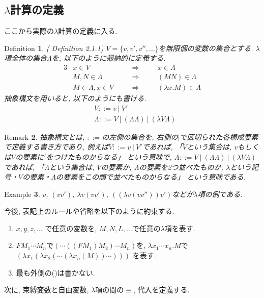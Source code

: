 \documentclass[11pt]{jsreport}
\theoremstyle{mystyle}
\newtheorem{df}{$\textrm{Definition}$}[section]
\newtheorem{ex}[df]{$\textrm{Example}$}
\newtheorem{rmk}[df]{$\textrm{Remark}$}
\newcommand{\brmk}{\begin{rmk}}
\newcommand{\ermk}{\end{rmk}}
\newcommand{\Lra}{\Longrightarrow}
\newcommand{\0}{\textbf{0}}
\begin{document}
\subsection*{$\lambda$計算の定義}
ここから実際の$\lambda$計算の定義に入る. 
\begin{shadebox}
  \begin{df}{(\cite{Bar} Definition 2.1.1)}
    $V = \{ v, v', v'', \ldots \}$を無限個の変数の集合とする. 
    $\lambda$項全体の集合$\Lambda$を, 以下のように帰納的に定義する. 
    \begin{alignat*}{3}
      &x \in V& \quad &\Lra& \quad &x \in \Lambda \\
      &M, N \in \Lambda& &\Lra& &(MN) \in \Lambda \\
      &M \in \Lambda, x \in V& &\Lra& &(\lambda x . M) \in \Lambda
    \end{alignat*}
    抽象構文を用いると, 以下のようにも書ける. 
    \begin{align*}
      &V ::= v\ |\ V' \\
      &\Lambda ::= V\ |\ (\Lambda \Lambda)\ |\ (\lambda V \Lambda)
    \end{align*}
  \end{df}
\end{shadebox}
\brmk
抽象構文とは, $::=$の左側の集合を, 右側の$|$で区切られた各構成要素で定義する書き方であり, 例えば$V ::= v\ |\ V'$であれば, 
「$V$という集合は, $v$もしくは$V$の要素に$'$をつけたものからなる」
という意味で, $\Lambda ::= V\ |\ (\Lambda \Lambda)\ |\ (\lambda V \Lambda)$であれば, 
「$\Lambda$という集合は, $V$の要素か, $\Lambda$の要素を2つ並べたものか, $\lambda$という記号・$V$の要素・$\Lambda$の要素をこの順で並べたものからなる」
という意味である. 
\ermk
\begin{ex}
  $v$, $(v v')$, $\lambda v (v v')$, $((\lambda v (vv''))v')$などが$\lambda$項の例である. 
\end{ex}
今後, 表記上のルールや省略を以下のように約束する. 
\begin{enumerate}
  \item $x, y, z, \ldots$ で任意の変数を, $M, N, L, \ldots$で任意の$\lambda$項を表す. 
  \item $F M_1 \cdots M_n$で$(\cdots ((F M_1) M_2)\cdots M_n)$を, 
           $\lambda x_1 \cdots x_n .M$で
           $(\lambda x_1 (\lambda x_2 (\cdots (\lambda x_n(M))\cdots)))$
            を表す. 
  \item 最も外側の()は書かない. 
\end{enumerate}
次に, 束縛変数と自由変数, $\lambda$項の間の$\equiv$, 代入を定義する. 
\end{document}

